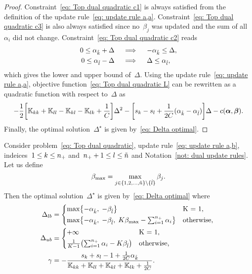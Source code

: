\begin{proof}
  Constraint~\eqref{eq: Top dual quadratic c1} is always satisfied from the definition of the update rule~\eqref{eq: update rule a,a}. Constraint~\eqref{eq: Top dual quadratic c3} is also always satisfied since no~$\beta_j$ was updated and the sum of all~$\alpha_i$ did not change. Constraint~\eqref{eq: Top dual quadratic c2} reads
  \begin{align*}
    0 \leq \alpha_{\hat{k}} + \Delta
    & \quad \implies \quad
    - \alpha_{\hat{k}} \leq \Delta, \\
    0 \leq \alpha_{\hat{l}} - \Delta
    & \quad \implies \quad
    \Delta \leq \alpha_{\hat{l}},
  \end{align*}
  which gives the lower and upper bound of~$\Delta.$ Using the update rule~\eqref{eq: update rule a,a}, objective function~\eqref{eq: Top dual quadratic L} can be rewritten as a quadratic function with respect to~$\Delta$ as
  \begin{equation*}
    - \frac{1}{2} \Brac[s]{\K_{kk} + \K_{ll} - \K_{kl} - \K_{lk} + \frac{1}{C}} \Delta^2
    - \Brac[s]{s_k - s_l + \frac{1}{2C}(\alphak - \alphal)} \Delta
    - c(\bm{\alpha}, \bm{\beta}).
  \end{equation*}
  Finally, the optimal solution~$\Delta^{\star}$ is given by~\eqref{eq: Delta optimal}.
\end{proof}

\begin{proposition}\label{prop: toppushk family quadratic update a,b}
  Consider problem~\eqref{eq: Top dual quadratic}, update rule~\eqref{eq: update rule a,b}, indeices~$1 \leq k \leq n_{+}$ and~$n_{+} + 1 \leq l \leq \tilde{n}$  and Notation~\ref{not: dual update rules}. Let us define
  \begin{equation*}
    \beta_{\max} = \max_{j \in \{1, 2, \ldots, \tilde{n} \} \setminus \{\hat{l}\}} \beta_j.
  \end{equation*}
  Then the optimal solution~$\Delta^{\star}$ is given by~\eqref{eq: Delta optimal} where
  \begin{align*}
    \Delta_{lb} & = 
      \begin{cases*}
        \max \Brac[c]{- \alphak,\;  -\betal} & K = 1, \\
        \max \Brac[c]{- \alphak,\;  -\betal, \; K\beta_{\max} - \sum_{i = 1}^{\npos} \alpha_i} & \textrm{otherwise},
      \end{cases*} \\
    \Delta_{ub} & = 
      \begin{cases*}
        + \infty & K = 1, \\
        \frac{1}{K-1}\Brac{\sum_{i = 1}^{\npos} \alpha_i - K \betal} & \textrm{otherwise},
      \end{cases*} \\
    \gamma & = -\frac{s_k + s_l - 1 + \frac{1}{2C} \alphak}{\K_{kk} + \K_{ll} + \K_{kl} + \K_{lk} + \frac{1}{2C}}.
  \end{align*}
\end{proposition}

